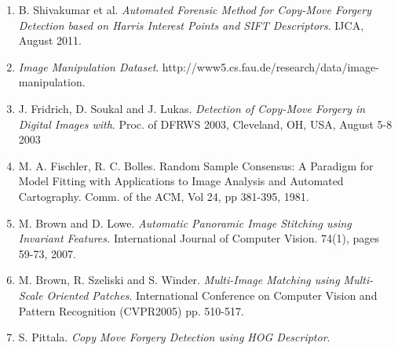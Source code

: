\documentclass[12pt]{article}
\begin{document}
\begin{enumerate}
\item B. Shivakumar et al. {\it Automated Forensic Method for Copy-Move Forgery Detection based on Harris Interest Points and SIFT Descriptors}. IJCA, August 2011. 
\item {\it Image Manipulation Dataset}. http://www5.cs.fau.de/research/data/image-manipulation. 
\item J. Fridrich, D. Soukal and J. Lukas. {\it Detection of Copy-Move Forgery in Digital Images with}. Proc. of DFRWS 2003, Cleveland, OH, USA, August 5-8 2003
\item M. A. Fischler, R. C. Bolles. Random Sample Consensus: A Paradigm for Model Fitting with Applications to Image Analysis and Automated Cartography. Comm. of the ACM, Vol 24, pp 381-395, 1981. 
\item M. Brown and D. Lowe. {\it Automatic Panoramic Image Stitching using Invariant Features.} International Journal of Computer Vision. 74(1), pages 59-73, 2007.
\item M. Brown, R. Szeliski and S. Winder. {\it Multi-Image Matching using Multi-Scale Oriented Patches}. International Conference on Computer Vision and Pattern Recognition (CVPR2005) pp. 510-517.
\item S. Pittala. {\it Copy Move Forgery Detection using HOG Descriptor}.
\end{enumerate}
\end{document}
